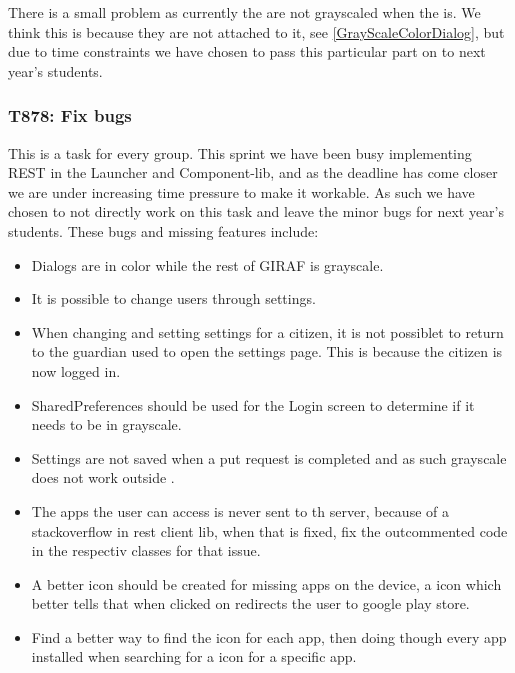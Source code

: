 There is a small problem as currently the  are not grayscaled
when the  is. We think this is because they are not attached to
it, see \autoref{GrayScaleColorDialog}, but due to time constraints we have
chosen to pass this particular part on to next year's students. 


\subsubsection{T878: Fix bugs}\label{T878}
This is a task for every group. This sprint we have been busy implementing REST
in the Launcher and Component-lib, and as the deadline has come closer we are
under increasing time pressure to make it workable. As such we have chosen to
not directly work on this task and leave the minor bugs for next year's
students.
These bugs and missing features include:

\begin{itemize}
  \item Dialogs are in color while the rest of GIRAF is grayscale.
  \item It is possible to change users through settings.
  \item When changing and setting settings for a citizen, it is not possiblet
  to return to the guardian used to open the settings page. This is because 
  the citizen is now logged in.
  \item SharedPreferences should be used for the Login screen to determine if
  it needs to be in grayscale.
  \item Settings are not saved when a put request is completed and as such
  grayscale does not work outside .
  \item The apps the user can access is never sent to th server, because of a
  stackoverflow in rest client lib, when that is fixed, fix the outcommented
  code in the respectiv classes for that issue.
  \item A better icon should be created for missing apps on the device, a icon
  which better tells that when clicked on redirects the user to google play
  store.
  \item Find a better way to find the icon for each app, then doing though every
  app installed when searching for a icon for a specific app.
\end{itemize}

